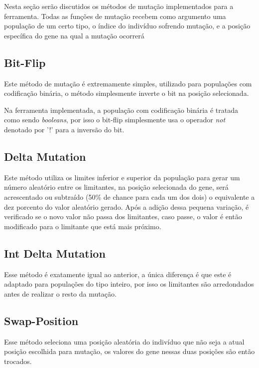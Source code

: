 \documentclass[12pt]{article}
\begin{document}
Nesta seção serão discutidos os métodos de mutação implementados para a ferramenta. Todas as funções de 
mutação recebem como argumento uma população de um certo tipo, o índice do indivíduo sofrendo mutação, e 
a posição específica do gene na qual a mutação ocorrerá

\subsection{Bit-Flip}

Este método de mutação é extremamente simples, utilizado para populações com codificação binária, 
o método simplesmente inverte o bit na posição selecionada.

Na ferramenta implementada, a população com codificação binária é tratada como sendo \textit{booleans}, 
por isso o bit-flip simplesmente usa o operador \textit{not} denotado por '!' para a inversão do bit.

\subsection{Delta Mutation}

Este método utiliza os limites inferior e superior da população para gerar um número aleatório entre os limitantes, 
na posição selecionada do gene, será acrescentado ou subtraído (50\% de chance para cada um dos dois) o 
equivalente a dez porcento do valor aleatório gerado. Após a adição dessa pequena variação, é verificado 
se o novo valor não passa dos limitantes, caso passe, o valor é então modificado para o limitante que 
está mais próximo.

\subsection{Int Delta Mutation} 

Esse método é exatamente igual ao anterior, a única diferença é que este é adaptado para populações 
do tipo inteiro, por isso os limitantes são arredondados antes de realizar o resto da mutação.

\subsection{Swap-Position}

Esse método seleciona uma posição aleatória do indivíduo que não seja a atual posição escolhida 
para mutação, os valores do gene nessas duas posições são então trocados.
\end{document}
